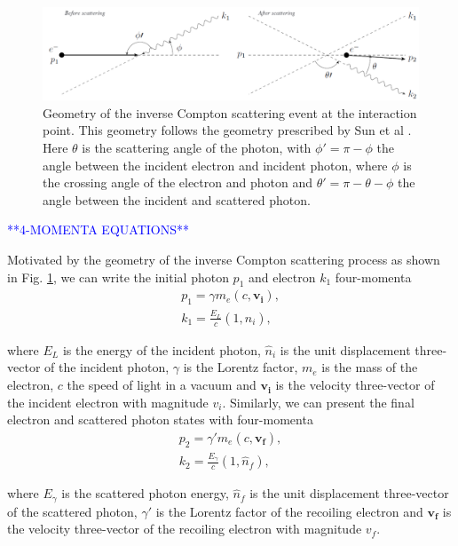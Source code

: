\documentclass[../main.tex]{subfiles}
\begin{document}
\begin{figure}[!h]
    \centering
    \includegraphics[width=\textwidth]{Figures/Theory_of_Photon_Production_by_Inverse_Compton_Scattering/scatteringkinematicsdiagram.pdf}
    \caption{Geometry of the inverse Compton scattering event at the interaction point. This geometry follows the geometry prescribed by Sun et al \cite{sun2009energy}. Here $\theta$ is the scattering angle of the photon, with $\phi' = \pi -\phi$ the angle between the incident electron and incident photon, where $\phi$ is the crossing angle of the electron and photon and $\theta' = \pi - \theta - \phi$ the angle between the incident and scattered photon. }
    \label{fig:scattered_photon_kinematics}
\end{figure}

\textcolor{blue}{**4-MOMENTA EQUATIONS**}

Motivated by the geometry of the inverse Compton scattering process as shown in Fig. \ref{fig:scattered_photon_kinematics}, we can write the initial photon $p_{1}$ and electron $k_{1}$ four-momenta
\begin{align}
p_{1} = \gamma m_{e}\left(c,\boldsymbol{v_{i}}\right),
\label{eq:initial_four_vectors} \\
k_{1} = \frac{E_{L}}{c}\left(1,\hat{n}_{i}\right), 
\end{align}

where $E_{L}$ is the energy of the incident photon, $\hat{n}_{i}$ is the unit displacement three-vector of the incident photon, $\gamma$ is the Lorentz factor, $m_{e}$ is the mass of the electron, $c$ the speed of light in a vacuum and $\boldsymbol{v_{i}}$ is the velocity three-vector of the incident electron with magnitude $v_{i}$. Similarly, we can present the final electron and scattered photon states with four-momenta 
\begin{align}
p_{2} = \gamma' m_{e}\left(c,\boldsymbol{v_{f}}\right), \\
k_{2} = \frac{E_{\gamma}}{c}\left(1,\hat{n}_{f}\right), 
\label{eq:final_four_vectors} 
\end{align}

where $E_{\gamma}$ is the scattered photon energy, $\hat{n}_{f}$ is the unit displacement three-vector of the scattered photon, $\gamma'$ is the Lorentz factor of the recoiling electron and $\boldsymbol{v_{f}}$ is the velocity three-vector of the recoiling electron with magnitude $v_{f}$.
\end{document}
